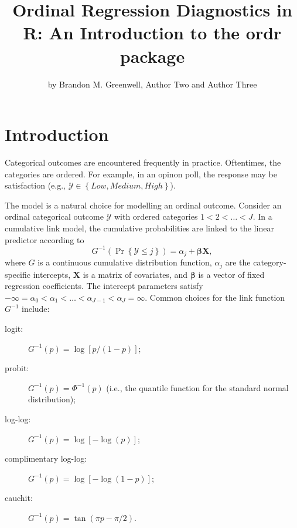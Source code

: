 \title{Ordinal Regression Diagnostics in R: An Introduction to the ordr package}
\author{by Brandon M. Greenwell, Author Two and Author Three}

\maketitle



\section{Introduction}

Categorical outcomes are encountered frequently in practice. Oftentimes, the categories are ordered. For example, in an opinon poll, the response may be satisfaction (e.g., $\mathcal{Y} \in \left\{Low, Medium, High\right\}$).

The  model is a natural choice for modelling an ordinal outcome. Consider an ordinal categorical outcome $\mathcal{Y}$ with ordered categories $1 < 2 < \dots < J$. In a cumulative link model, the cumulative probabilities are linked to the linear predictor according to
\begin{equation}
\label{eqn:clm}
  G^{-1}\left(\Pr\left\{\mathcal{Y} \le j\right\}\right) = \alpha_j + \boldsymbol{\beta}\boldsymbol{X},
\end{equation}
where $G$ is a continuous cumulative distribution function, $\alpha_j$ are the category-specific intercepts, $\boldsymbol{X}$ is a matrix of covariates, and $\boldsymbol{\beta}$ is a vector of fixed regression coefficients. The intercept parameters satisfy $-\infty = \alpha_0 < \alpha_1 < \dots < \alpha_{J-1} < \alpha_J = \infty$. Common choices for the link function $G^{-1}$ include:
\begin{description}
  \item[logit:] $G^{-1}\left(p\right) = \log\left[p / \left(1 - p\right)\right]$;
  \item[probit:] $G^{-1}\left(p\right) = \Phi^{-1}\left(p\right)$ (i.e., the quantile function for the standard normal distribution);
  \item[log-log:] $G^{-1}\left(p\right) = \log\left[-\log\left(p\right)\right]$;
  \item[complimentary log-log:] $G^{-1}\left(p\right) = \log\left[-\log\left(1 - p\right)\right]$;
  \item[cauchit:] $G^{-1}\left(p\right) = \tan\left(\pi p - \pi / 2\right)$.
\end{description}

